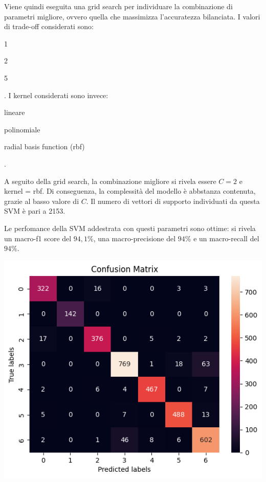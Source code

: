 Viene quindi eseguita una grid search per individuare la combinazione di parametri
migliore, ovvero quella che massimizza l'accuratezza bilanciata.
I valori di trade-off considerati sono: \begin{itemize*}
    \item 1
    \item 2
    \item 5
\end{itemize*}.
I kernel considerati sono invece: \begin{itemize*}
    \item lineare
    \item polinomiale
    \item radial basis function (rbf)
\end{itemize*}.

A seguito della grid search, la combinazione migliore si rivela essere $C=2$ e
kernel = rbf. Di conseguenza, la complessità del modello è abbstanza contenuta,
grazie al basso valore di $C$.
Il numero di vettori di supporto individuati da questa SVM è pari a 2153.

Le perfomance della SVM addestrata con questi parametri sono ottime:
si rivela un macro-f1 score del $94,1\%$, 
una macro-precisione del $94\%$ e un macro-recall del $94\%$.

\begin{Figure}
    \centering
    \includegraphics[width=\linewidth]{img/svm_confusion_matrix.png}
\end{Figure}

